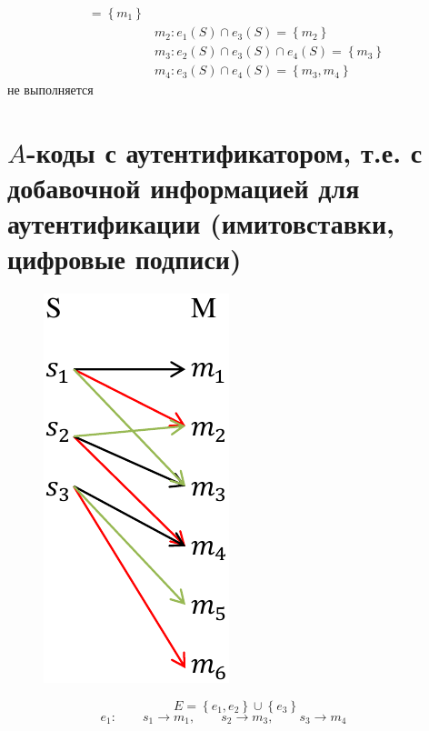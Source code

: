 \begin{example}
\begin{enumerate}
\begin{equation*}
\begin{split}
      =\left\{{m}_{1}\right\} \\
      &{m}_{2}:{e}_{1}\left(S\right) \cap {e}_{3}\left(S\right)
      =\left\{{m}_{2}\right\} \\
      &{m}_{3}:{e}_{2}\left(S\right) \cap {e}_{3}\left(S\right)
               \cap {e}_{4}\left(S\right)
      =\left\{{m}_{3}\right\} \\
      &{m}_{4}:{e}_{3}\left(S\right) \cap {e}_{4}\left(S\right)
      =\left\{{m}_{3},{m}_{4}\right\}
    \end{split}
    \end{equation*}
    не выполняется
  \end{enumerate}
\end{example}

\section{$A$-коды с аутентификатором,
  т.е. с добавочной информацией для аутентификации (имитовставки, цифровые
  подписи)}

\begin{figure}[h]
  \centering
  \includegraphics[scale=0.5]{a_codes}
\end{figure}
\begin{equation*}
  E = \left\{ {e}_{1},{e}_{2} \right\} \cup \left\{{e}_{3}\right\}
\end{equation*}
\begin{equation*}
{e}_{1}:\qquad
{s}_{1}\rightarrow {m}_{1},\qquad
{s}_{2}\rightarrow {m}_{3},\qquad
{s}_{3}\rightarrow {m}_{4} \qquad
\end{equation*}

